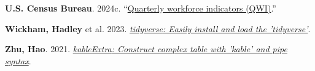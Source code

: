 \documentclass[
]{article}
\newlength{\cslhangindent}
\newenvironment{CSLReferences}[2] %
 {\begin{list}{}{%
  \setlength{\itemindent}{0pt}
  \setlength{\leftmargin}{0pt}
  \setlength{\parsep}{0pt}
  \ifodd #1
   \setlength{\leftmargin}{\cslhangindent}
   \setlength{\itemindent}{-1\cslhangindent}
  \fi
  \setlength{\itemsep}{#2\baselineskip}}}
 {\end{list}}
\begin{document}
\begin{CSLReferences}{1}{0}
\textbf{U.S. Census Bureau}. 2024c.
{``\href{https://lehd.ces.census.gov/data/}{Quarterly workforce
indicators (QWI)}.''}

\textbf{Wickham, Hadley} et al. 2023.
\emph{\href{https://CRAN.R-project.org/package=tidyverse}{{tidyverse}:
Easily install and load the 'tidyverse'}}.

\textbf{Zhu, Hao}. 2021.
\emph{\href{https://CRAN.R-project.org/package=kableExtra}{{kableExtra}:
Construct complex table with 'kable' and pipe syntax}}.

\end{CSLReferences}
\end{document}
